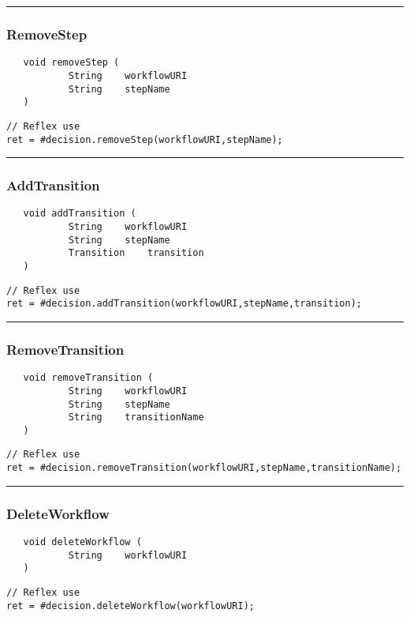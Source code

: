 \rule{15cm}{2pt}
\subsubsection{RemoveStep}
\label{Api:RemoveStep}
\begin{verbatim}
   void removeStep (
           String    workflowURI
           String    stepName
   )
\end{verbatim}
\begin{lstlisting}[language=reflex]
// Reflex use
ret = #decision.removeStep(workflowURI,stepName);
\end{lstlisting}



\rule{15cm}{2pt}
\subsubsection{AddTransition}
\label{Api:AddTransition}
\begin{verbatim}
   void addTransition (
           String    workflowURI
           String    stepName
           Transition    transition
   )
\end{verbatim}
\begin{lstlisting}[language=reflex]
// Reflex use
ret = #decision.addTransition(workflowURI,stepName,transition);
\end{lstlisting}



\rule{15cm}{2pt}
\subsubsection{RemoveTransition}
\label{Api:RemoveTransition}
\begin{verbatim}
   void removeTransition (
           String    workflowURI
           String    stepName
           String    transitionName
   )
\end{verbatim}
\begin{lstlisting}[language=reflex]
// Reflex use
ret = #decision.removeTransition(workflowURI,stepName,transitionName);
\end{lstlisting}



\rule{15cm}{2pt}
\subsubsection{DeleteWorkflow}
\label{Api:DeleteWorkflow}
\begin{verbatim}
   void deleteWorkflow (
           String    workflowURI
   )
\end{verbatim}
\begin{lstlisting}[language=reflex]
// Reflex use
ret = #decision.deleteWorkflow(workflowURI);
\end{lstlisting}



